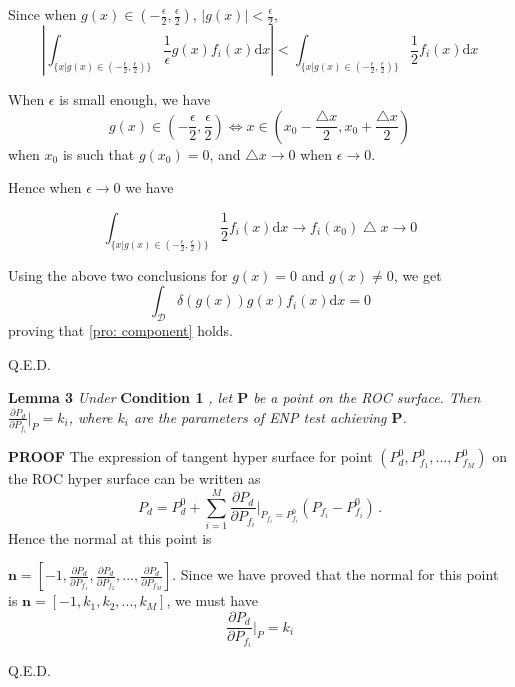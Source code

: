 Since when $g(x) \in (-\frac{\epsilon}{2}, \frac{\epsilon}{2})$, $|g(x)| < \frac{\epsilon}{2}$,
\begin{equation}|
\int_{\{x|g(x)\in (-\frac{\epsilon}{2}, \frac{\epsilon}{2})\}} \frac{1}{\epsilon} g(x)f_i(x) \mathrm{d}x | <
\int_{\{x|g(x)\in (-\frac{\epsilon}{2}, \frac{\epsilon}{2})\}} \frac{1}{2}f_i(x) \mathrm{d}x
\end{equation}

When $\epsilon$ is small enough, we have 
\[
  g(x) \in (-\frac{\epsilon}{2}, \frac{\epsilon}{2}) \Leftrightarrow  x \in (x_0 - \frac{\triangle x}{2}, x_0 + \frac{\triangle x}{2})
\]
when $x_0 $ is such that $g(x_0) = 0$, and $\triangle x \rightarrow 0$ when $\epsilon \rightarrow 0$. 

Hence when $\epsilon \rightarrow 0$ we have 

\def \LEFT{ x_s
  -\left(\frac{n!\varepsilon}{2|g^{(n)}(x_s)|}\right)^{\frac{1}{n}}}
  \def \RIGHT{ x_s
  +\left(\frac{n!\varepsilon}{2|g^{(n)}(x_s)|}\right)^{\frac{1}{n}}}
\begin{equation}
\int_{\{x|g(x)\in (-\frac{\epsilon}{2}, \frac{\epsilon}{2})\}} \frac{1}{2}f_i(x) \mathrm{d}x \rightarrow
f_i(x_0)\bigtriangleup x \rightarrow 0
\end{equation}

Using the above two conclusions for $g(x) = 0$ and $g(x) \neq 0$, we get
\begin{equation}
\int_{\mathcal{D}} \delta (g(x)) g(x)f_i(x) \mathrm{d}x = 0
\end{equation}
proving that \eqref{pro: component} holds.

Q.E.D.

\noindent \textbf{Lemma 3}
\textit{
\noindent
Under}
\textbf{Condition 1}
\textit{, let $\mathbf{P}$ be a point on the ROC surface. Then $\frac{\partial P_d}{\partial P_{f_i}} \bigg|_P = k_i$, where $k_i$ are the parameters of ENP test achieving $\mathbf{P}$.
}

\noindent\textbf{PROOF}
The expression of tangent hyper surface for point $(P_d^0, P_{f_1}^0, ..., P_{f_M}^0)$ on the ROC hyper surface can be written as
\begin{equation}
P_d = P_d^0 + \sum_{i=1}^{M} \frac{\partial P_d}{\partial P_{f_i}}\bigg|_{P_{f_i} = P_{f_i}^0}(P_{f_i} - P_{f_i}^0)\,.
\end{equation}
Hence the normal at this point is

 $\mathbf{n} = [-1, \frac{\partial P_d}{\partial P_{f_1}}, \frac{\partial P_d}{\partial P_{f_2}}, ..., \frac{\partial P_d}{\partial P_{f_M}}]$. Since we have proved that  the normal for this point is $\mathbf{n} = [-1, k_1, k_2, ..., k_M]$, we must have
\begin{equation}
\frac{\partial P_d}{\partial P_{f_i}}\bigg|_{P} = k_i
\end{equation}

Q.E.D.
